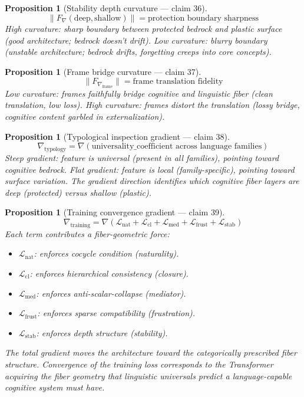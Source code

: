 \documentclass[11pt,a4paper]{article}
\newtheorem{proposition}[definition]{Proposition}
\begin{document}
\begin{proposition}[Stability depth curvature --- claim 36]
\label{prop:depth_curv}
\[
  \|F_\nabla(\text{deep}, \text{shallow})\| = \text{protection boundary
    sharpness}
\]
High curvature: sharp boundary between protected bedrock and plastic
surface (good architecture; bedrock doesn't drift). Low curvature:
blurry boundary (unstable architecture; bedrock drifts, forgetting
creeps into core concepts).
\end{proposition}

\begin{proposition}[Frame bridge curvature --- claim 37]
\label{prop:frame_curv}
\[
  \|F_{\nabla_{\text{frame}}}\| = \text{frame translation fidelity}
\]
Low curvature: frames faithfully bridge cognitive and linguistic fiber
(clean translation, low loss). High curvature: frames distort the
translation (lossy bridge, cognitive content garbled in externalization).
\end{proposition}

\begin{proposition}[Typological inspection gradient --- claim 38]
\label{prop:typology_grad}
\[
  \nabla_{\text{typology}} = \nabla\left(\text{universality\_coefficient
    across language families}\right)
\]
Steep gradient: feature is universal (present in all families),
pointing toward cognitive bedrock. Flat gradient: feature is local
(family-specific), pointing toward surface variation. The gradient
direction identifies which cognitive fiber layers are deep (protected)
versus shallow (plastic).
\end{proposition}

\begin{proposition}[Training convergence gradient --- claim 39]
\label{prop:training_grad}
\[
  \nabla_{\text{training}} = \nabla\left(\mathcal{L}_{\text{nat}} +
    \mathcal{L}_{\text{cl}} + \mathcal{L}_{\text{med}} +
    \mathcal{L}_{\text{frust}} + \mathcal{L}_{\text{stab}}\right)
\]
Each term contributes a fiber-geometric force:
\begin{itemize}
  \item $\mathcal{L}_{\text{nat}}$: enforces cocycle condition
    (naturality).
  \item $\mathcal{L}_{\text{cl}}$: enforces hierarchical consistency
    (closure).
  \item $\mathcal{L}_{\text{med}}$: enforces anti-scalar-collapse
    (mediator).
  \item $\mathcal{L}_{\text{frust}}$: enforces sparse compatibility
    (frustration).
  \item $\mathcal{L}_{\text{stab}}$: enforces depth structure
    (stability).
\end{itemize}
The total gradient moves the architecture toward the categorically
prescribed fiber structure. Convergence of the training loss corresponds
to the Transformer acquiring the fiber geometry that linguistic
universals predict a language-capable cognitive system must have.
\end{proposition}
\end{document}
